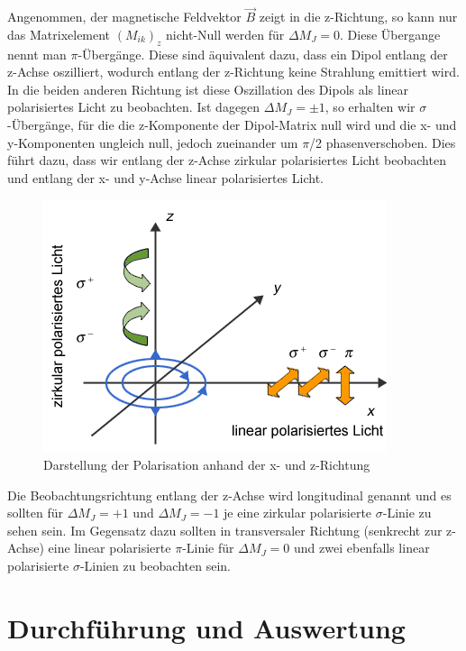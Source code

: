 Angenommen, der magnetische Feldvektor $\vec{B}$ zeigt in die z-Richtung, so kann nur das Matrixelement $(M_{ik})_z$ nicht-Null werden für $\Delta M_J = 0$. Diese Übergange nennt man $\pi$-Übergänge. Diese sind äquivalent dazu, dass ein Dipol entlang der z-Achse oszilliert, wodurch entlang der z-Richtung keine Strahlung emittiert wird. In die beiden anderen Richtung ist diese Oszillation des Dipols als linear polarisiertes Licht zu beobachten.
Ist dagegen $\Delta M_J = \pm 1$, so erhalten wir $\sigma$-Übergänge, für die die z-Komponente der Dipol-Matrix null wird und die x- und y-Komponenten ungleich null, jedoch zueinander um $\pi$/2 phasenverschoben. Dies führt dazu, dass wir entlang der z-Achse zirkular polarisiertes Licht beobachten und entlang der x- und y-Achse linear polarisiertes Licht.
\begin{figure}
  \includegraphics[width=\linewidth]{images/Polarisation.png}
  \caption{\cite{Chemga} Darstellung der Polarisation anhand der x- und z-Richtung}
  \label{fig:Polarisation}
\end{figure}

Die Beobachtungsrichtung entlang der z-Achse wird longitudinal genannt und es sollten für $\Delta M_J = + 1$ und $\Delta M_J = - 1$ je eine zirkular polarisierte $\sigma$-Linie zu sehen sein. Im Gegensatz dazu sollten in transversaler Richtung (senkrecht zur z-Achse) eine linear polarisierte $\pi$-Linie für $\Delta M_J = 0$ und zwei ebenfalls linear polarisierte $\sigma$-Linien zu beobachten sein.


\section{Durchführung und Auswertung}

